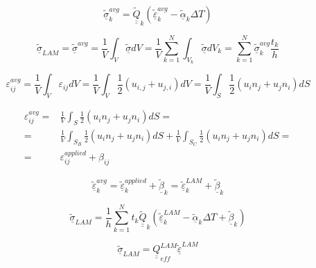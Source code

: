 \documentclass[review]{elsarticle}
\begin{document}
\begin{equation}
\underline{\tilde{\sigma}}_{k}^{avg}=\underline{\underline{\tilde{Q}}}_{k}\left(\underline{\tilde{\varepsilon}}_{k}^{avg}-\underline{\tilde{\alpha}}_{k}\Delta T\right)
\end{equation}

\begin{equation}
\underline{\tilde{\sigma}}_{LAM}=\underline{\tilde{\sigma}}^{avg}=\frac{1}{V}\int_{V}\underline{\tilde{\sigma}}dV=\frac{1}{V}\sum_{k=1}^{N}\int_{V_{k}}\underline{\tilde{\sigma}}dV_{k}=\sum_{k=1}^{N}\underline{\tilde{\sigma}}_{k}^{avg}\frac{t_{k}}{h}
\end{equation}

\begin{equation}
\varepsilon_{ij}^{avg}=\frac{1}{V}\int_{V}\varepsilon_{ij}dV=\frac{1}{V}\int_{V}\frac{1}{2}\left(u_{i,j}+u_{j,i}\right)dV=\frac{1}{V}\int_{S}\frac{1}{2}\left(u_{i}n_{j}+u_{j}n_{i}\right)dS
\end{equation}

\begin{equation}
\begin{aligned}
\varepsilon_{ij}^{avg}=&\frac{1}{V}\int_{S}\frac{1}{2}\left(u_{i}n_{j}+u_{j}n_{i}\right)dS=\\
=&\frac{1}{V}\int_{S_{B}}\frac{1}{2}\left(u_{i}n_{j}+u_{j}n_{i}\right)dS+\frac{1}{V}\int_{S_{C}}\frac{1}{2}\left(u_{i}n_{j}+u_{j}n_{i}\right)dS=\\
=&\varepsilon_{ij}^{applied}+\beta_{ij}
\end{aligned}
\end{equation}

\begin{equation}
\underline{\tilde{\varepsilon}}_{k}^{avg}=\underline{\tilde{\varepsilon}}_{k}^{applied}+\underline{\tilde{\beta}}_{k}=\underline{\tilde{\varepsilon}}_{k}^{LAM}+\underline{\tilde{\beta}}_{k}
\end{equation}

\begin{equation}
\underline{\tilde{\sigma}}_{LAM}=\frac{1}{h}\sum_{k=1}^{N}t_{k}\underline{\underline{\tilde{Q}}}_{k}\left(\underline{\tilde{\varepsilon}}_{k}^{LAM}-\underline{\tilde{\alpha}}_{k}\Delta T+\underline{\tilde{\beta}}_{k}\right)
\end{equation}

\begin{equation}
\underline{\tilde{\sigma}}_{LAM}=\underline{\underline{Q}}_{eff}^{LAM}\underline{\tilde{\varepsilon}}^{LAM}
\end{equation}
\end{document}
